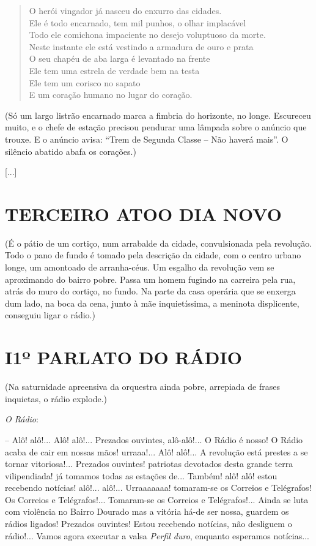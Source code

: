 \begin{verse}
O herói vingador já nasceu do enxurro das cidades.\\
Ele é todo encarnado, tem mil punhos, o olhar implacável\\
Todo ele comichona impaciente no desejo voluptuoso da morte.\\
Neste instante ele está vestindo a armadura de ouro e prata\\
O seu chapéu de aba larga é levantado na frente\\
Ele tem uma estrela de verdade bem na testa\\
Ele tem um corisco no sapato\\
E um coração humano no lugar do coração.
\end{verse}

\hfill\parbox{150pt}{
(Só um largo listrão encarnado marca a fimbria do horizonte, no longe.
Escureceu muito, e o chefe de estação precisou pendurar uma lâmpada
sobre o anúncio que trouxe. E o anúncio avisa: ``Trem de Segunda Classe
-- Não haverá mais''. O silêncio abatido abafa os corações.)
}

{[}...{]}

\pagebreak
\section{TERCEIRO ATO\break O DIA NOVO}

\hfill\parbox{150pt}{
(É o pátio de um cortiço, num arrabalde da cidade, convulsionada pela
revolução. Todo o pano de fundo é tomado pela descrição da cidade, com o
centro urbano longe, um amontoado de arranha-céus. Um esgalho da
revolução vem se aproximando do bairro pobre. Passa um homem fugindo na
carreira pela rua, atrás do muro do cortiço, no fundo. Na parte da casa
operária que se enxerga dum lado, na boca da cena, junto à mãe
inquietíssima, a meninota displicente, conseguiu ligar o rádio.)
}

\section{I\break 1º PARLATO DO RÁDIO}

\hfill\parbox{150pt}{
(Na saturnidade apreensiva da orquestra ainda pobre, arrepiada de frases
inquietas, o rádio explode.)
}

\emph{O Rádio}:

-- Alô! alô!... Alô! alô!... Prezados ouvintes, alô-alô!... O
Rádio é nosso! O Rádio acaba de cair em nossas mãos! urraaa!... Alô!
alô!... A revolução está prestes a se tornar vitoriosa!... Prezados
ouvintes! patriotas devotados desta grande terra vilipendiada! já
tomamos todas as estações de... Também! alô! alô! estou recebendo
notícias! alô!... alô!... Urraaaaaaa! tomaram-se os Correios e
Telégrafos! Os Correios e Telégrafos!... Tomaram-se os Correios e
Telégrafos!... Ainda se luta com violência no Bairro Dourado mas a
vitória há-de ser nossa, guardem os rádios ligados! Prezados ouvintes!
Estou recebendo notícias, não desliguem o rádio!... Vamos agora executar
a valsa \emph{Perfil duro}, enquanto esperamos notícias...

